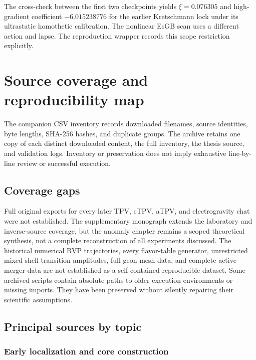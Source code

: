 \documentclass[11pt,oneside]{report}
\begin{document}
The cross-check between the first two checkpoints yields $\xi=0.076305$ and high-gradient coefficient $-6.015238776$ for the earlier Kretschmann lock under its ultrastatic homothetic calibration. The nonlinear EsGB scan uses a different action and lapse. The reproduction wrapper records this scope restriction explicitly.


\chapter{Source coverage and reproducibility map}
The companion CSV inventory records downloaded filenames, source identities, byte lengths, SHA-256 hashes, and duplicate groups. The archive retains one copy of each distinct downloaded content, the full inventory, the thesis source, and validation logs. Inventory or preservation does not imply exhaustive line-by-line review or successful execution.
\section{Coverage gaps}
Full original exports for every later TPV, cTPV, aTPV, and electrogravity chat were not established. The supplementary monograph extends the laboratory and inverse-source coverage, but the anomaly chapter remains a scoped theoretical synthesis, not a complete reconstruction of all experiments discussed. The historical numerical BVP trajectories, every flavor-table generator, unrestricted mixed-shell transition amplitudes, full geon mesh data, and complete active merger data are not established as a self-contained reproducible dataset. Some archived scripts contain absolute paths to older execution environments or missing imports. They have been preserved without silently repairing their scientific assumptions.
\section{Principal sources by topic}
\subsection{Early localization and core construction}
\noindent{}\par
\noindent{}\par
\noindent{}\par
\noindent{}\par
\noindent{}\par
\noindent{}\par
\end{document}
